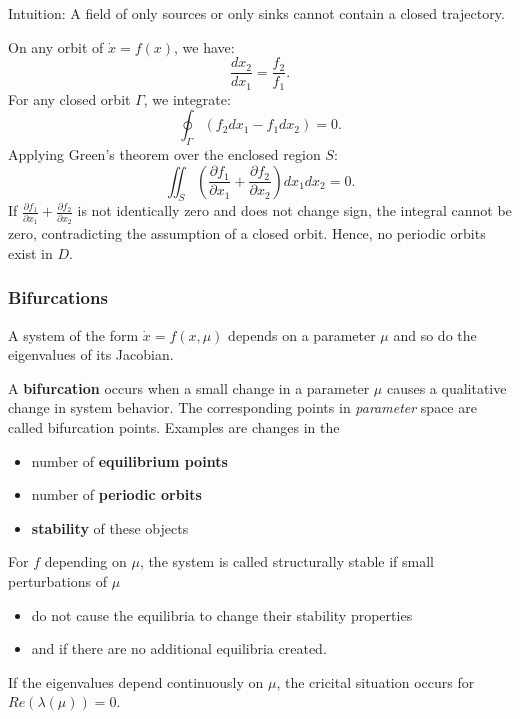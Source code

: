 Intuition: A field of only sources or only sinks cannot contain a closed trajectory.
\begin{examplesection}
    On any orbit of $\dot{x} = f(x)$, we have:
    \noindent\begin{equation*}
        \frac{dx_2}{dx_1} = \frac{f_2}{f_1}.
    \end{equation*}
    For any closed orbit $\Gamma$, we integrate:
    \noindent\begin{equation*}
        \oint_{\Gamma} \left( f_2 dx_1 - f_1 dx_2 \right) = 0.
    \end{equation*}
    Applying Green's theorem over the enclosed region $S$:
    \noindent\begin{equation*}
        \iint_{S} \left( \frac{\partial f_1}{\partial x_1} + \frac{\partial f_2}{\partial x_2} \right) dx_1 dx_2 = 0.
    \end{equation*}
    If $\frac{\partial f_1}{\partial x_1} + \frac{\partial f_2}{\partial x_2}$ is not identically zero and does not change sign, the integral cannot be zero, contradicting the assumption of a closed orbit. Hence, no periodic orbits exist in $D$.
\end{examplesection}

\subsubsection{Bifurcations}

A system of the form $\dot{x} = f(x, \mu)$ depends on a parameter $\mu$ and so do the eigenvalues of its Jacobian.

\newpar{}

A \textbf{bifurcation} occurs when a small change in a parameter $\mu$ causes a qualitative change in system behavior. The corresponding points in \textit{parameter} space are called bifurcation points. Examples are changes in the
\begin{itemize}
    \item number of \textbf{equilibrium points}
    \item number of \textbf{periodic orbits}
    \item \textbf{stability} of these objects
\end{itemize}

\newpar{}

For $f$ depending on $\mu$, the system is called structurally stable if small perturbations of $\mu$
\begin{itemize}
    \item do not cause the equilibria to change their stability properties
    \item and if there are no additional equilibria created.
\end{itemize}
If the eigenvalues depend continuously on $\mu$, the cricital situation occurs for $Re(\lambda(\mu))=0$.


